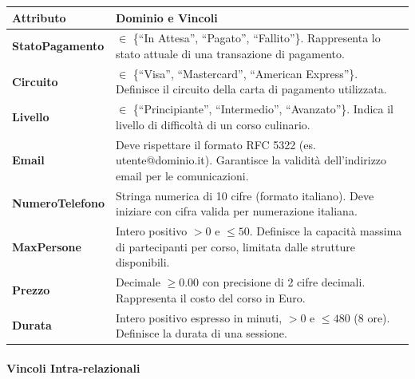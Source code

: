 \begin{center}
\begin{tcolorbox}[colback=white!98!gray, colframe=myblue!80!black, title=Vincoli di Dominio, arc=4mm, boxrule=0.8pt, width=0.98\textwidth]
\renewcommand{\arraystretch}{1.2}
\begin{tabularx}{\textwidth}{p{4cm}X}
\textbf{Attributo} & \textbf{Dominio e Vincoli} \\
\hline
\textbf{StatoPagamento} & $\in$ \{``In Attesa'', ``Pagato'', ``Fallito''\}. Rappresenta lo stato attuale di una transazione di pagamento. \\
\hline
\textbf{Circuito} & $\in$ \{``Visa'', ``Mastercard'', ``American Express''\}. Definisce il circuito della carta di pagamento utilizzata. \\
\hline
\textbf{Livello} & $\in$ \{``Principiante'', ``Intermedio'', ``Avanzato''\}. Indica il livello di difficoltà di un corso culinario. \\
\hline
\textbf{Email} & Deve rispettare il formato RFC 5322 (es. utente@dominio.it). Garantisce la validità dell'indirizzo email per le comunicazioni. \\
\hline
\textbf{NumeroTelefono} & Stringa numerica di 10 cifre (formato italiano). Deve iniziare con cifra valida per numerazione italiana. \\
\hline
\textbf{MaxPersone} & Intero positivo $> 0$ e $\leq 50$. Definisce la capacità massima di partecipanti per corso, limitata dalle strutture disponibili. \\
\hline
\textbf{Prezzo} & Decimale $\geq 0.00$ con precisione di 2 cifre decimali. Rappresenta il costo del corso in Euro. \\
\hline
\textbf{Durata} & Intero positivo espresso in minuti, $> 0$ e $\leq 480$ (8 ore). Definisce la durata di una sessione. \\
\hline
\end{tabularx}
\end{tcolorbox}
\end{center}

\paragraph{Vincoli Intra-relazionali}

